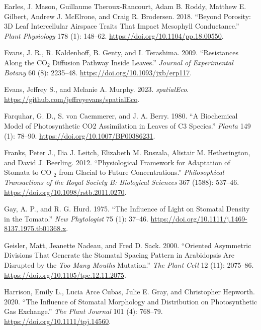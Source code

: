 \documentclass[12pt,halfline,a4paper,]{ouparticle}
\newlength{\cslhangindent}
\newlength{\cslentryspacingunit} %
\newenvironment{CSLReferences}[2] %
 {%
  \setlength{\parindent}{0pt}
  \ifodd #1
  \let\oldpar\par
  \def\par{\hangindent=\cslhangindent\oldpar}
  \fi
  \setlength{\parskip}{#2\cslentryspacingunit}
 }%
 {}
\begin{document}
\begin{CSLReferences}{1}{0}
\leavevmode{}%
Earles, J. Mason, Guillaume Theroux-Rancourt, Adam B. Roddy, Matthew E.
Gilbert, Andrew J. McElrone, and Craig R. Brodersen. 2018. {``Beyond
{Porosity}: {3D} {Leaf} {Intercellular} {Airspace} {Traits} {That}
{Impact} {Mesophyll} {Conductance}.''} \emph{Plant Physiology} 178 (1):
148--62. \url{https://doi.org/10.1104/pp.18.00550}.

\leavevmode{}%
Evans, J. R., R. Kaldenhoff, B. Genty, and I. Terashima. 2009.
{``Resistances Along the {CO}\(_{\textrm{2}}\) Diffusion Pathway Inside
Leaves.''} \emph{Journal of Experimental Botany} 60 (8): 2235--48.
\url{https://doi.org/10.1093/jxb/erp117}.

\leavevmode{}%
Evans, Jeffrey S., and Melanie A. Murphy. 2023. \emph{{spatialEco}}.
\url{https://github.com/jeffreyevans/spatialEco}.

\leavevmode{}%
Farquhar, G. D., S. von Caemmerer, and J. A. Berry. 1980. {``A
Biochemical Model of Photosynthetic {CO2} Assimilation in Leaves of {C3}
Species.''} \emph{Planta} 149 (1): 78--90.
\url{https://doi.org/10.1007/BF00386231}.

\leavevmode{}%
Franks, Peter J., Ilia J. Leitch, Elizabeth M. Ruszala, Alistair M.
Hetherington, and David J. Beerling. 2012. {``Physiological Framework
for Adaptation of Stomata to {CO} \(_{\textrm{2}}\) from Glacial to
Future Concentrations.''} \emph{Philosophical Transactions of the Royal
Society B: Biological Sciences} 367 (1588): 537--46.
\url{https://doi.org/10.1098/rstb.2011.0270}.

\leavevmode{}%
Gay, A. P., and R. G. Hurd. 1975. {``The Influence of Light on Stomatal
Density in the Tomato.''} \emph{New Phytologist} 75 (1): 37--46.
\url{https://doi.org/10.1111/j.1469-8137.1975.tb01368.x}.

\leavevmode{}%
Geisler, Matt, Jeanette Nadeau, and Fred D. Sack. 2000. {``Oriented
{Asymmetric} {Divisions} {That} {Generate} the {Stomatal} {Spacing}
{Pattern} in {Arabidopsis} {Are} {Disrupted} by the \emph{Too Many
Mouths} {Mutation}.''} \emph{The Plant Cell} 12 (11): 2075--86.
\url{https://doi.org/10.1105/tpc.12.11.2075}.

\leavevmode{}%
Harrison, Emily L., Lucia Arce Cubas, Julie E. Gray, and Christopher
Hepworth. 2020. {``The Influence of Stomatal Morphology and Distribution
on Photosynthetic Gas Exchange.''} \emph{The Plant Journal} 101 (4):
768--79. \url{https://doi.org/10.1111/tpj.14560}.


\end{CSLReferences}
\end{document}
